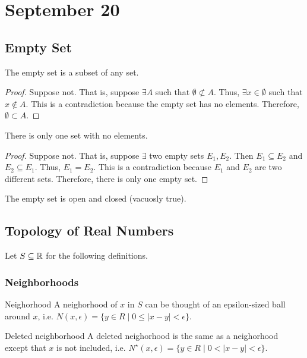 \chapter{September 20}

\section{Empty Set}
\begin{theorem}{}{}
    The empty set is a subset of any set.
\end{theorem}
\begin{proof}
    Suppose not. That is, suppose $\exists A$ such that $\emptyset \not\subset A$. Thus, $\exists x \in \emptyset$ such that $x \not\in A$. This is a contradiction because the empty set has no elements. Therefore, $\emptyset \subset A$.
\end{proof}

\begin{theorem}{}{}
    There is only one set with no elements.
\end{theorem}
\begin{proof}
    Suppose not. That is, suppose $\exists$ two empty sets $E_1, E_2$. Then $E_1 \subseteq E_2$ and $E_2 \subseteq E_1$. Thus, $E_1 = E_2$. This is a contradiction because $E_1$ and $E_2$ are two different sets. Therefore, there is only one empty set.
\end{proof}
\begin{note}
    The empty set is open and closed (vacuosly true).
\end{note}

\section{Topology of Real Numbers}
Let $S \subseteq \mathbb{R}$ for the following definitions.

\subsection{Neighborhoods}
\begin{definition}{Neighorhood}{}
    A neighorhood of $x$ in $S$ can be thought of an epsilon-sized ball around $x$, i.e. $N(x, \epsilon) = \{ y \in R \mid 0 \leq |x - y| < \epsilon \}$.
\end{definition}
\begin{definition}{Deleted neighborhood}{}
    A deleted neighorhood is the same as a neighorhood except that $x$ is not included, i.e. $N^\star(x, \epsilon) = \{ y \in R \mid 0 < |x - y| < \epsilon \}$.
\end{definition}

